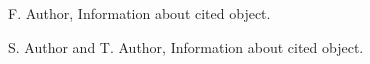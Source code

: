 \documentclass[sw]{iosart2x}
\begin{document}









\begin{thebibliography}{0}

 F. Author, Information about cited object.

 S. Author and T. Author, Information about cited object.

\end{thebibliography}
\end{document}
